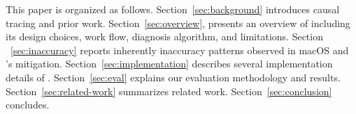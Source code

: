 This paper is organized as follows. Section~\ref{sec:background}
introduces causal tracing and prior work. Section~\ref{sec:overview},
presents an overview of \xxx including its design choices, work flow,
diagnosis algorithm, and limitations.  Section ~\ref{sec:inaccuracy}
reports inherently inaccuracy patterns observed in macOS and \xxx's
mitigation. Section~\ref{sec:implementation} describes several
implementation details of \xxx.  Section~\ref{sec:eval} explains our
evaluation methodology and results.  Section~\ref{sec:related-work}
summarizes related work.  Section~\ref{sec:conclusion} concludes.
